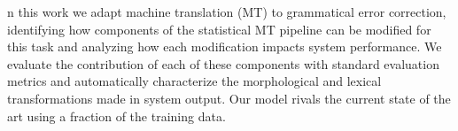 n this work we adapt machine translation (MT) to grammatical error correction, identifying how components of the statistical MT pipeline can be modified for this task and analyzing how each modification impacts system performance. We evaluate the contribution of each of these components with standard evaluation metrics and automatically characterize the morphological and lexical transformations made in system output. Our model rivals the current state of the art using a fraction of the training data.
